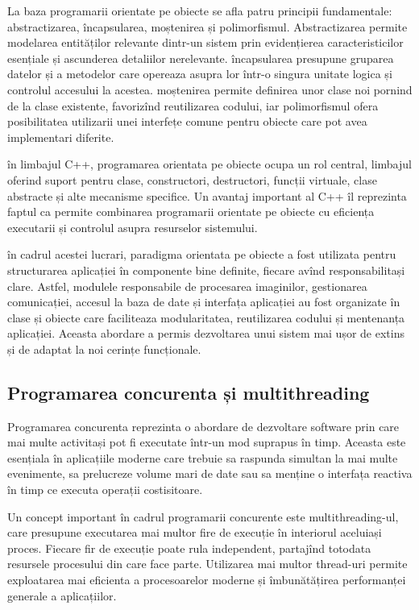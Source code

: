 La baza programarii orientate pe obiecte se afla patru principii fundamentale: abstractizarea, încapsularea, moștenirea și polimorfismul. Abstractizarea permite modelarea entităților relevante dintr-un sistem prin evidențierea caracteristicilor esențiale și ascunderea detaliilor nerelevante. încapsularea presupune gruparea datelor și a metodelor care opereaza asupra lor într-o singura unitate logica și controlul accesului la acestea. moștenirea permite definirea unor clase noi pornind de la clase existente, favorizînd reutilizarea codului, iar polimorfismul ofera posibilitatea utilizarii unei interfețe comune pentru obiecte care pot avea implementari diferite.

în limbajul C++, programarea orientata pe obiecte ocupa un rol central, limbajul oferind suport pentru clase, constructori, destructori, funcții virtuale, clase abstracte și alte mecanisme specifice. Un avantaj important al C++ îl reprezinta faptul ca permite combinarea programarii orientate pe obiecte cu eficiența executarii și controlul asupra resurselor sistemului.

în cadrul acestei lucrari, paradigma orientata pe obiecte a fost utilizata pentru structurarea aplicației în componente bine definite, fiecare avînd responsabilitași clare. Astfel, modulele responsabile de procesarea imaginilor, gestionarea comunicației, accesul la baza de date și interfața aplicației au fost organizate în clase și obiecte care faciliteaza modularitatea, reutilizarea codului și mentenanța aplicației. Aceasta abordare a permis dezvoltarea unui sistem mai ușor de extins și de adaptat la noi cerințe funcționale.

\subsection*{Programarea concurenta și multithreading}

Programarea concurenta reprezinta o abordare de dezvoltare software prin care mai multe activitași pot fi executate într-un mod suprapus în timp. Aceasta este esențiala în aplicațiile moderne care trebuie sa raspunda simultan la mai multe evenimente, sa prelucreze volume mari de date sau sa menține o interfața reactiva în timp ce executa operații costisitoare.

Un concept important în cadrul programarii concurente este multithreading-ul, care presupune executarea mai multor fire de execuție în interiorul aceluiași proces. Fiecare fir de execuție poate rula independent, partajînd totodata resursele procesului din care face parte. Utilizarea mai multor thread-uri permite exploatarea mai eficienta a procesoarelor moderne și îmbunătățirea performanței generale a aplicațiilor.

